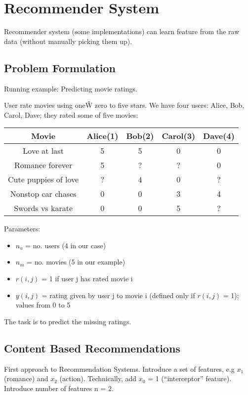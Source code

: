 \documentclass{scrartcl}
\begin{document}
\section{Recommender System}
\label{sec:16}

Recommender system (some implementations) can learn feature from the
raw data (without manually picking them up). 
 
\subsection{Problem Formulation}
\label{sec:16-1}
Running example: Predicting movie ratings.

User rate movies using one\^ W zero to five stars. We have four users:
Alice, Bob, Carol, Dave; they rated some of five movies:

\begin{tabular}{c|cccc}
  \textbf{Movie} & \textbf{Alice(1)} & \textbf{Bob(2)} &
  \textbf{Carol(3)} & \textbf{ Dave(4)} \\
\hline
Love at last & 5 & 5 & 0 & 0 \\
Romance forever & 5 & ? & ? & 0 \\
Cute puppies of love & ? & 4 & 0 & ? \\
Nonstop car chases & 0 & 0 & 3 & 4 \\
Swords vs karate & 0 & 0 & 5 & ?
\end{tabular}

Parameters:
\begin{itemize}
\item $n_u$ = no. users (4 in our case)
\item $n_m$ = no. movies (5 in our example)
\item $r(i, j)$ = 1 if user j has rated movie i
\item $y(i, j)$ = rating given by user j to movie i (defined only if
  $r(i, j)$ = 1); values from 0 to 5
\end{itemize}

The task is to predict the missing ratings.

\subsection{Content Based Recommendations}
\label{sec:16-2}

First approach to Recommendation Systems.
Introduce a set of features, e.g $x_1$ (romance) and $x_2$ (action).
Technically, add $x_0$ = 1 (``interceptor'' feature). Introduce number
of features n = 2.
\end{document}
